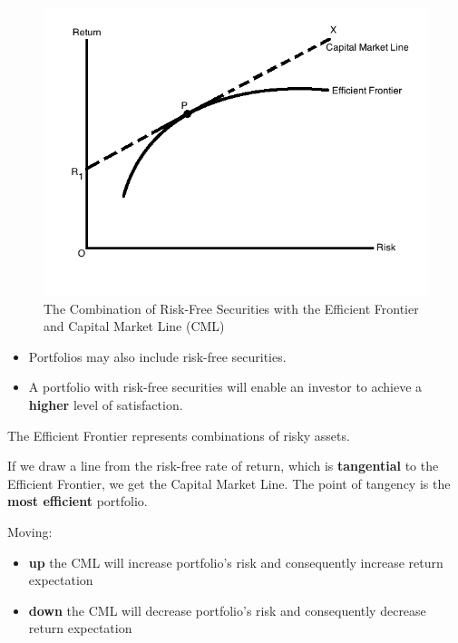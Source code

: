 \documentclass{beamer}
\begin{document}
\begin{frame}

\begin{figure}
	\centering
	\includegraphics[scale = 0.25]{fig4.jpg}
	\caption{The Combination of Risk-Free Securities with the Efficient Frontier and Capital Market Line (CML)}
	\label{fig:fig4}
\end{figure}

\vskip -0.4cm
\justifying
\begin{itemize}
	\justifying
	\item Portfolios may also include risk-free securities.
	\item A portfolio with risk-free securities will enable an investor to achieve a \textbf{higher} level of satisfaction.
\end{itemize}

\end{frame}



\begin{frame}

The Efficient Frontier represents combinations of risky assets.

\vspace{0.8cm}
\justifying
If we draw a line from the risk-free rate of return, which is \textbf{tangential} to the Efficient Frontier, we get the Capital Market Line. The point of tangency is the \textbf{most efficient} portfolio.

\vspace{0.8cm}
\justifying
Moving:
\begin{itemize}
	\justifying
	\item \textbf{up} the CML will increase portfolio's risk and consequently increase return expectation
	\item \textbf{down} the CML will decrease portfolio's risk and consequently decrease return expectation
\end{itemize}

\end{frame}
\end{document}
